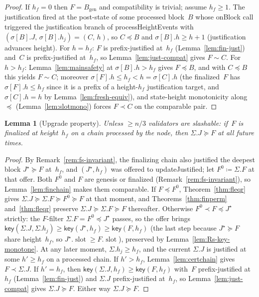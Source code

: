 \ifx\litemode\undefined\documentclass{article}\fi
\newcommand{\genesis}{\ensuremath{B_{\mathrm{gen}}}}
\newcommand{\slot}[0]{\ensuremath{\operatorname{\mathrm{slot}}}}
\newcommand{\processHeightEvents}{\textsf{processHeightEvents}\xspace}
\newcommand{\onBlock}{\textsf{onBlock}\xspace}
\newcommand{\updateJustified}{\textsf{updateJustified}\xspace}
\newcommand{\key}{\ensuremath{\mathsf{key}}}
\theoremstyle{plain}
\newtheorem{lemma}{Lemma}
\theoremstyle{definition}
\theoremstyle{remark}
\begin{document}
\begin{proof}
If $h_f = 0$ then $F = \genesis$ and compatibility is trivial; assume $h_f \geq 1$.
The justification fired at the post-state of some processed block~$B$ whose \onBlock call triggered the justification branch of \processHeightEvents with $(\sigma[B].J,\, \sigma[B].h_j) = (C,\, h)$, so $C \preceq B$ and $\sigma[B].h \geq h + 1$ (justification advances height).
For $h = h_f$: $F$ is prefix-justified at~$h_f$ (Lemma~\ref{lem:fin-just}) and~$C$ is prefix-justified at~$h_f$, so Lemma~\ref{lem:just-compat} gives $F \sim C$.
For $h > h_f$: Lemma~\ref{lem:mainsafety} at $\sigma[B].h > h_f$ gives $F \preceq B$, and with $C \preceq B$ this yields $F \sim C$; moreover $\sigma[F].h \leq h_f < h = \sigma[C].h$ (the finalized~$F$ has $\sigma[F].h \leq h_f$ since it is a prefix of a height-$h_f$ justification target, and $\sigma[C].h = h$ by Lemma~\ref{lem:fresh-equiv}), and state-height monotonicity along $\preceq$ (Lemma~\ref{lem:slotmono}) forces $F \prec C$ on the comparable pair.
\end{proof}

\begin{lemma}[Upgrade property]\label{lem:upgrade}
Unless $\geq n/3$ validators are slashable: if~$F$ is finalized at height~$h_f$ on a chain processed by the node, then $\Sigma.J \succeq F$ at all future times.
\end{lemma}

\begin{proof}
By Remark~\ref{rem:fs-invariant}, the finalizing chain also justified the deepest block $J^\star \succeq F$ at~$h_f$, and $(J^\star, h_f)$ was offered to \updateJustified; let $F^0 \coloneqq \Sigma.F$ at that offer.
Both $F^0$ and $F$ are genesis or finalized (Remark~\ref{rem:fs-invariant}), so Lemma~\ref{lem:finchain} makes them comparable.
If $F \preceq F^0$, Theorem~\ref{thm:fleqr} gives $\Sigma.J \succeq \Sigma.F \succeq F^0 \succeq F$ at that moment, and Theorems~\ref{thm:finperm} and~\ref{thm:fleqr} preserve $\Sigma.J \succeq \Sigma.F \succeq F$ thereafter.
Otherwise $F^0 \prec F \preceq J^\star$ strictly: the $F$-filter $\Sigma.F = F^0 \preceq J^\star$ passes, so the offer brings $\key(\Sigma.J, \Sigma.h_j) \geq \key(J^\star, h_f) \geq \key(F, h_f)$ (the last step because $J^\star \succeq F$ share height~$h_f$, so $J^\star.\slot \geq F.\slot$), preserved by Lemma~\ref{lem:Rs-key-monotone}.
At any later moment, $\Sigma.h_j \geq h_f$, and the current $\Sigma.J$ is justified at some $h' \geq h_f$ on a processed chain.
If $h' > h_f$, Lemma~\ref{lem:certchain} gives $F \prec \Sigma.J$.
If $h' = h_f$, then $\key(\Sigma.J, h_f) \geq \key(F, h_f)$ with~$F$ prefix-justified at~$h_f$ (Lemma~\ref{lem:fin-just}) and $\Sigma.J$ prefix-justified at~$h_f$, so Lemma~\ref{lem:just-compat} gives $\Sigma.J \succeq F$.
Either way $\Sigma.J \succeq F$.
\end{proof}
\end{document}
